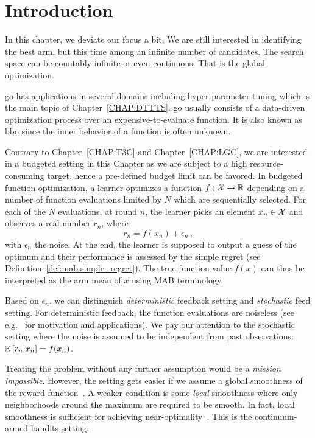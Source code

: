 \section{Introduction}\label{sec:gpo.intro}

In this chapter, we deviate our focus a bit. We are still interested in identifying the best arm, but this time among an infinite number of candidates. The search space can be countably infinite or even continuous. That is the global optimization. 

\gls{go} has applications in several domains including hyper-parameter tuning \citep{jamieson2016hyperband, li2017hyperband,samothrakis2013} which is the main topic of Chapter~\ref{CHAP:DTTTS}. \gls{go} usually consists of a data-driven optimization process over an expensive-to-evaluate function. It is also known as \gls{bbo} since the inner behavior of a function is often unknown.

Contrary to Chapter~\ref{CHAP:T3C} and Chapter~\ref{CHAP:LGC}, we are interested in a budgeted setting in this Chapter as we are subject to a high resource-consuming target, hence a pre-defined budget limit can be favored. In budgeted function optimization, a learner optimizes a function $f: \mathcal{X} \rightarrow \mathbb{R}$ depending on a number of function evaluations limited by $N$ which are sequentially selected. For each of the $N$ evaluations, at round $n$, the learner
picks an element $x_n\in\mathcal{X}$ and observes a real number $r_n$, where 
\[
    r_n = f(x_n) + \epsilon_n\,,
\]
with $\epsilon_n$ the noise. At the end, the learner is supposed to output a guess of the optimum and their performance is assessed by the simple regret (see Definition~\ref{def:mab.simple_regret}). The true function value $f(x)$ can thus be interpreted as the arm mean of $x$ using MAB terminology. 

Based on $\epsilon_n$, we can distinguish \emph{deterministic} feedback setting and \emph{stochastic} feed setting. For deterministic feedback, the function evaluations are noiseless (see e.g.~\citealt{defreitas2012gp} for motivation and applications). We pay our attention to the stochastic setting where the noise is assumed to be independent from past observations: $\mathbb{E}\left[r_n|x_n\right] = f(x_n)$.

Treating the problem without any further assumption would be a \emph{mission impossible}. However, the setting gets easier if we assume a global smoothness of the reward function~\citep{agrawal1995continuum,kleinberg2004nearly,kleinberg2008multi,cope2009,auer2007improved,slivkins2011taxonomy,kleinberg2013}. A weaker condition is some \emph{local} smoothness where only neighborhoods around the maximum are required to be smooth.  In fact, local smoothness is sufficient for achieving near-optimality~\citep{valko2013stosoo,azar2014online,grill2015poo,bull2015adaptive}. This is the \gls{continuum-armed bandits} setting.

